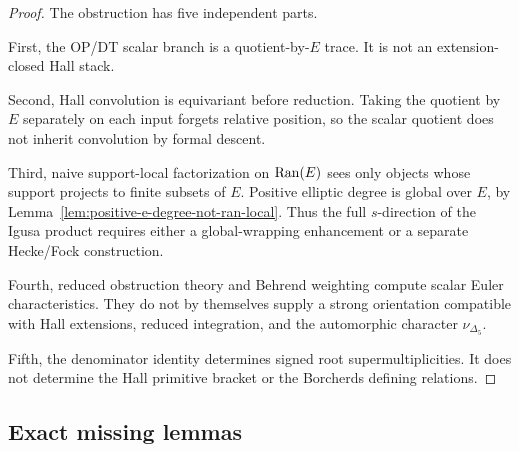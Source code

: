 \begin{proof}
The obstruction has five independent parts.

First, the OP/DT scalar branch is a quotient-by-\(E\) trace.  It is not
an extension-closed Hall stack.

Second, Hall convolution is equivariant before reduction.  Taking the
quotient by \(E\) separately on each input forgets relative position, so
the scalar quotient does not inherit convolution by formal descent.

Third, naive support-local factorization on \(\operatorname{Ran}(E)\) sees only
objects whose support projects to finite subsets of \(E\).  Positive
elliptic degree is global over \(E\), by
Lemma~\ref{lem:positive-e-degree-not-ran-local}.  Thus the full
\(s\)-direction of the Igusa product requires either a global-wrapping
enhancement or a separate Hecke/Fock construction.

Fourth, reduced obstruction theory and Behrend weighting compute scalar
Euler characteristics.  They do not by themselves supply a strong
orientation compatible with Hall extensions, reduced integration, and the
automorphic character \(\nu_{\Delta_5}\).

Fifth, the denominator identity determines signed root
supermultiplicities.  It does not determine the Hall primitive bracket or
the Borcherds defining relations.
\end{proof}

\subsection{Exact missing lemmas}

